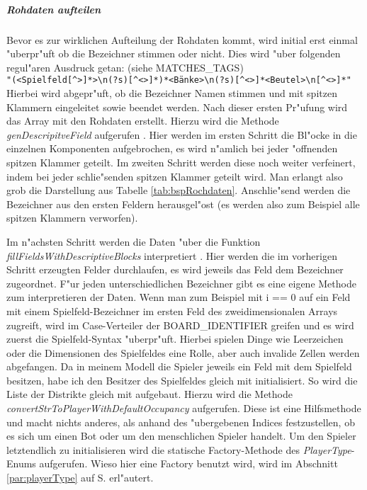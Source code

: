 \subparagraph{Rohdaten aufteilen}
\label{spar:converter_ablauf}
Bevor es zur wirklichen Aufteilung der Rohdaten kommt, wird initial erst einmal "uberpr"uft ob die Bezeichner stimmen oder nicht. Dies wird "uber folgenden regul"aren Ausdruck getan: (siehe MATCHES\_TAGS)
\\ \verb|"(<Spielfeld[^>]*>\n(?s)[^<>]*)*<Bänke>\n(?s)[^<>]*<Beutel>\n[^<>]*"|
\\ Hierbei wird abgepr"uft, ob die Bezeichner Namen stimmen und mit spitzen Klammern eingeleitet sowie beendet werden. Nach dieser ersten Pr"ufung wird das Array mit den Rohdaten erstellt. Hierzu wird die Methode \emph{genDescripitveField} aufgerufen . Hier werden im ersten Schritt die Bl"ocke in die einzelnen Komponenten aufgebrochen, es wird n"amlich bei jeder "offnenden spitzen Klammer geteilt. Im zweiten Schritt werden diese noch weiter verfeinert, indem bei jeder schlie"senden spitzen Klammer geteilt wird. Man erlangt also grob die Darstellung aus Tabelle \ref{tab:bspRochdaten}. Anschlie"send werden die Bezeichner aus den ersten Feldern herausgel"ost (es werden also zum Beispiel alle spitzen Klammern verworfen).

Im n"achsten Schritt werden die Daten "uber die Funktion \emph{fillFieldsWithDescriptiveBlocks} interpretiert . Hier werden die im vorherigen Schritt erzeugten Felder durchlaufen, es wird jeweils das Feld dem Bezeichner zugeordnet. F"ur jeden unterschiedlichen Bezeichner gibt es eine eigene Methode zum interpretieren der Daten. Wenn man zum Beispiel mit i == 0 auf ein Feld mit einem Spielfeld-Bezeichner im ersten Feld des zweidimensionalen Arrays zugreift, wird im Case-Verteiler der BOARD\_IDENTIFIER greifen und es wird zuerst die Spielfeld-Syntax "uberpr"uft. Hierbei spielen Dinge wie Leerzeichen oder die Dimensionen des Spielfeldes eine Rolle, aber auch invalide Zellen werden abgefangen. Da in meinem Modell die Spieler jeweils ein Feld mit dem Spielfeld besitzen, habe ich den Besitzer des Spielfeldes gleich mit initialisiert. So wird die Liste der Distrikte gleich mit aufgebaut. Hierzu wird die Methode \emph{convertStrToPlayerWithDefaultOccupancy} aufgerufen. Diese ist eine Hilfsmethode und macht nichts anderes, als anhand des "ubergebenen Indices festzustellen, ob es sich um einen Bot oder um den menschlichen Spieler handelt. Um den Spieler letztendlich zu initialisieren wird die statische Factory-Methode des \emph{PlayerType}-Enums aufgerufen. Wieso hier eine Factory benutzt wird, wird im Abschnitt \ref{par:playerType} auf S. \pageref{par:playerType} erl"autert. 


